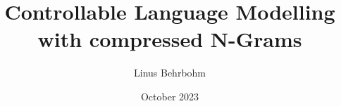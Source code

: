
\title{Controllable Language Modelling with compressed N-Grams}
\date{October 2023}
\author{Linus Behrbohm}

%
%